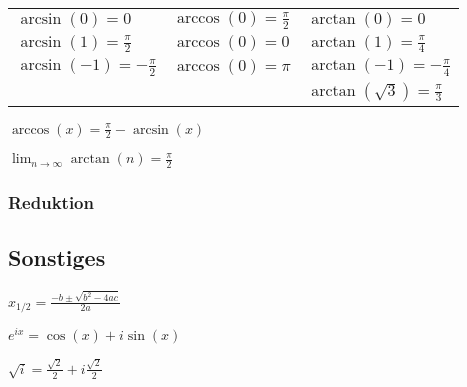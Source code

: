 \begin{tabular}{l | l | l}
    $\arcsin(0) = 0$                & $\arccos(0) = \frac{\pi}{2}$ & $\arctan(0) = 0$\\
    $\arcsin(1) = \frac{\pi}{2}$    & $\arccos(0) = 0$             & $\arctan(1) = \frac{\pi}{4}$\\
    $\arcsin(-1) = -\frac{\pi}{2}$  & $\arccos(0) = \pi$           & $\arctan(-1) = -\frac{\pi}{4}$\\
                                    &                               & $\arctan(\sqrt{3}) = \frac{\pi}{3}$\\
\end{tabular}

\begin{compactitem}
    \item $\arccos(x) = \frac{\pi}{2} - \arcsin(x)$
    \item $\lim_{n \to \infty} \arctan(n) = \frac{\pi}{2}$
\end{compactitem}

\subsubsection{Reduktion}

\subsection{Sonstiges}
\begin{compactitem}
    \item $x_{1 / 2} = \frac{-b \pm \sqrt{b^2 - 4ac}}{2a}$
    \item $e^{ix} = \cos(x) + i \sin(x)$
    \item $\sqrt{i} = \frac{\sqrt{2}}{2} + i \frac{\sqrt{2}}{2}$
\end{compactitem}

